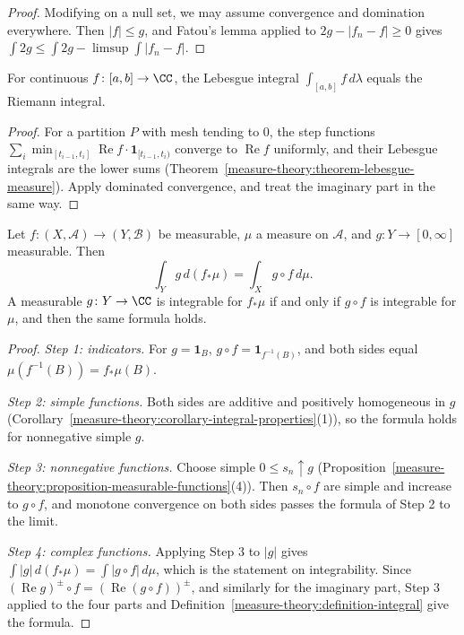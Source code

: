\begin{proof}
Modifying on a null set, we may assume convergence and domination everywhere. Then $|f| \leq g$, and Fatou's lemma applied to $2g - |f_n - f| \geq 0$ gives
$\int 2g \leq \int 2g - \limsup\int|f_n - f|$.
\end{proof}

\begin{proposition}\label{measure-theory:proposition-riemann-lebesgue}
For continuous $f \colon [a, b] \to \CC$, the Lebesgue integral $\int_{[a,b]}f\,d\lambda$ equals the Riemann integral.
\end{proposition}

\begin{proof}
For a partition $P$ with mesh tending to $0$, the step functions $\sum_i\min_{[t_{i-1}, t_i]}\operatorname{Re}f \cdot \mathbf{1}_{[t_{i-1}, t_i)}$ converge to $\operatorname{Re}f$ uniformly, and their Lebesgue integrals are
the lower sums (Theorem~\ref{measure-theory:theorem-lebesgue-measure}). Apply dominated convergence, and treat the imaginary part in the same way.
\end{proof}

\begin{proposition}\label{measure-theory:proposition-image-measure}
Let $f \colon (X, \mathcal{A}) \to (Y, \mathcal{B})$ be measurable, $\mu$ a measure on $\mathcal{A}$, and $g \colon Y \to [0, \infty]$ measurable. Then
\[
\int_Yg\,d(f_*\mu) = \int_Xg \circ f\,d\mu.
\]
A measurable $g \colon Y \to \CC$ is integrable for $f_*\mu$ if and only if $g \circ f$ is integrable for $\mu$, and then the same formula holds.
\end{proposition}

\begin{proof}
\emph{Step 1: indicators.} For $g = \mathbf{1}_B$, $g \circ f = \mathbf{1}_{f^{-1}(B)}$, and both sides equal $\mu(f^{-1}(B)) = f_*\mu(B)$.

\emph{Step 2: simple functions.} Both sides are additive and positively homogeneous in $g$ (Corollary~\ref{measure-theory:corollary-integral-properties}(1)), so the formula holds for nonnegative simple $g$.

\emph{Step 3: nonnegative functions.} Choose simple $0 \leq s_n \uparrow g$ (Proposition~\ref{measure-theory:proposition-measurable-functions}(4)). Then $s_n \circ f$ are simple and increase to $g \circ f$, and
monotone convergence on both sides passes the formula of Step 2 to the limit.

\emph{Step 4: complex functions.} Applying Step 3 to $|g|$ gives $\int|g|\,d(f_*\mu) = \int|g \circ f|\,d\mu$, which is the statement on integrability. Since $(\operatorname{Re}g)^\pm \circ f = (\operatorname{Re}(g \circ f))^\pm$,
and similarly for the imaginary part, Step 3 applied to the four parts and Definition~\ref{measure-theory:definition-integral} give the formula.
\end{proof}


